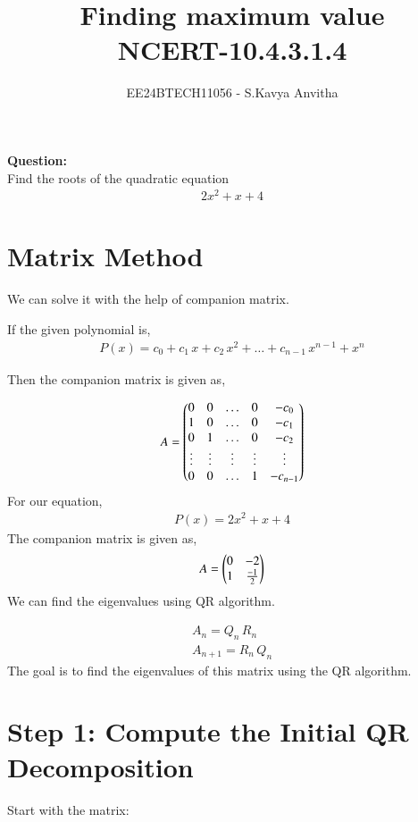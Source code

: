 \documentclass[journal]{IEEEtran}
\begin{document}

\vspace{3cm}

\title{Finding maximum value\\NCERT-10.4.3.1.4}
\author{EE24BTECH11056 - S.Kavya Anvitha}
\maketitle
\bigskip

\renewcommand{\thefigure}{\theenumi}
\renewcommand{\thetable}{\theenumi}
\textbf{Question:}\\
Find the roots of the quadratic equation 
\begin{align*}
    2x^2 + x + 4
\end{align*}
\section{\textbf{Matrix Method}}
We can solve it with the help of companion matrix.

If the given polynomial is,
\begin{align}
	P(x) = c_0 + c_1\,x + c_2\,x^2 + \dots + c_{n-1}\,x^{n-1} + x^n
\end{align}

Then the companion matrix is given as,

\begin{align}
	A = \begin{pmatrix}0 & 0 & \dots & 0 & -c_0\\1 & 0 & \dots & 0 & -c_1\\0 & 1 & \dots & 0 & -c_2\\\vdots & \vdots & \vdots & \vdots &\vdots \\0 & 0 & \dots & 1 & -c_{n-1}\end{pmatrix}
\end{align}
For our equation,
\begin{align}
  P(x) =  2x^2 + x + 4
\end{align}
The companion matrix is given as,
\begin{align}
   A = \begin{pmatrix}0 & -2\\1 & \frac{-1}{2}\end{pmatrix} 
\end{align}
We can find the eigenvalues using QR algorithm.

\begin{align}
    A_n = Q_n\,R_n\\
    A_{n+1} = R_n\,Q_n
\end{align}
The goal is to find the eigenvalues of this matrix using the QR algorithm.

\section*{Step 1: Compute the Initial QR Decomposition}
Start with the matrix:
\end{document}
